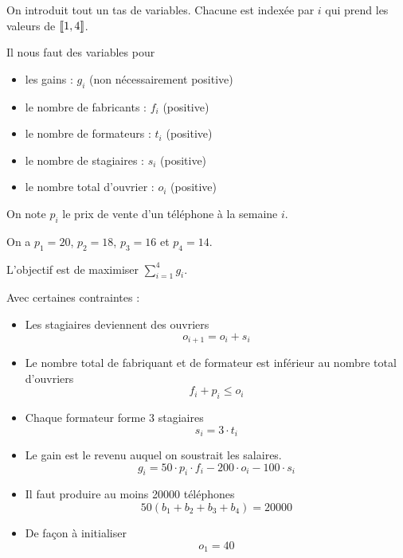 On introduit tout un tas de variables. Chacune est indexée par $i$ qui prend les valeurs de $\left\llbracket 1, 4 \right\rrbracket$.

Il nous faut des variables pour
\begin{itemize}
    \item les gains : $g_i$ (non nécessairement positive)
    \item le nombre de fabricants : $f_i$ (positive)
    \item le nombre de formateurs : $t_i$ (positive)
    \item le nombre de stagiaires : $s_i$ (positive)
    \item le nombre total d'ouvrier : $o_i$ (positive)
\end{itemize}

On note $p_i$ le prix de vente d'un téléphone à la semaine $i$.

On a $p_1 = 20$, $p_2 = 18$, $p_3 = 16$ et $p_4 = 14$.

L'objectif est de maximiser $\sum\limits_{i=1}^4 g_i$.

Avec certaines contraintes :
\begin{itemize}
    \item Les stagiaires deviennent des ouvriers
        \[
            o_{i+1} =  o_i + s_i
        \]
    \item Le nombre total de fabriquant et de formateur est inférieur au nombre total d'ouvriers
        \[
            f_i+p_i \leqslant o_i
        \]
    \item Chaque formateur forme 3 stagiaires
        \[
            s_i=3\cdot t_i        
        \]
    \item Le gain est le revenu auquel on soustrait les salaires.
        \[
            g_i = 50\cdot p_i \cdot f_i-200\cdot o_i-100\cdot s_i
        \]
    \item Il faut produire au moins 20000 téléphones
        \[
            50(b_1+b_2+b_3+b_4) = 20000
        \]
    \item De façon à initialiser
        \[
            o_1 = 40
        \]
\end{itemize}





